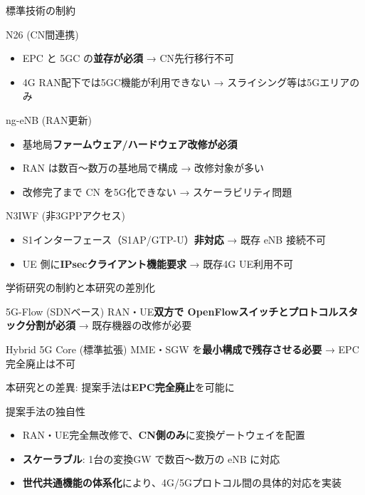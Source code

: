 \documentclass[dvipdfmx,11pt,aspectratio=169]{beamer}
\begin{document}
\begin{frame}{標準技術の制約}
  \begin{block}{N26 (CN間連携)}
    \small
    \begin{itemize}
      \item EPC と 5GC の\textbf{並存が必須} → CN先行移行不可
      \item 4G RAN配下では5GC機能が利用できない → スライシング等は5Gエリアのみ
    \end{itemize}
  \end{block}

  \begin{block}{ng-eNB (RAN更新)}
    \small
    \begin{itemize}
      \item 基地局\textbf{ファームウェア/ハードウェア改修が必須}
      \item RAN は数百～数万の基地局で構成 → 改修対象が多い
      \item \alert{改修完了まで CN を5G化できない} → スケーラビリティ問題
    \end{itemize}
  \end{block}

  \begin{block}{N3IWF (非3GPPアクセス)}
    \small
    \begin{itemize}
      \item S1インターフェース（S1AP/GTP-U）\textbf{非対応} → 既存 eNB 接続不可
      \item UE 側に\textbf{IPsecクライアント機能要求} → 既存4G UE利用不可
    \end{itemize}
  \end{block}
\end{frame}

\begin{frame}{学術研究の制約と本研究の差別化}
  \begin{block}{5G-Flow (SDNベース)}
    \small
    RAN・UE\textbf{双方で OpenFlowスイッチとプロトコルスタック分割が必須}
    → 既存機器の改修が必要
  \end{block}

  \begin{block}{Hybrid 5G Core (標準拡張)}
    \small
    MME・SGW を\textbf{最小構成で残存させる必要} → EPC完全廃止は不可

    本研究との差異: 提案手法は\textbf{EPC完全廃止}を可能に
  \end{block}

  \begin{block}{提案手法の独自性}
    \small
    \begin{itemize}
      \item RAN・UE完全無改修で、\textbf{CN側のみ}に変換ゲートウェイを配置
      \item \textbf{スケーラブル}: 1台の変換GW で数百～数万の eNB に対応
      \item \textbf{世代共通機能の体系化}により、4G/5Gプロトコル間の具体的対応を実装
    \end{itemize}
  \end{block}
\end{frame}
\end{document}
